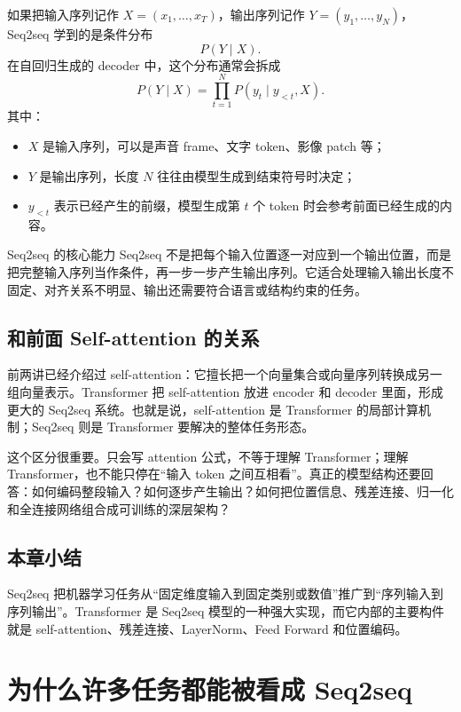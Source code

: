 \documentclass[a4paper]{article}
\begin{document}
如果把输入序列记作 $X=(x_1,\ldots,x_T)$，输出序列记作 $Y=(y_1,\ldots,y_N)$，Seq2seq 学到的是条件分布
\[
    P(Y\mid X).
\]
在自回归生成的 decoder 中，这个分布通常会拆成
\[
    P(Y\mid X)
    =
    \prod_{t=1}^{N} P(y_t \mid y_{<t}, X).
\]
其中：
\begin{itemize}
    \item $X$ 是输入序列，可以是声音 frame、文字 token、影像 patch 等；
    \item $Y$ 是输出序列，长度 $N$ 往往由模型生成到结束符号时决定；
    \item $y_{<t}$ 表示已经产生的前缀，模型生成第 $t$ 个 token 时会参考前面已经生成的内容。
\end{itemize}

\begin{importantbox}{Seq2seq 的核心能力}
    Seq2seq 不是把每个输入位置逐一对应到一个输出位置，而是把完整输入序列当作条件，再一步一步产生输出序列。它适合处理输入输出长度不固定、对齐关系不明显、输出还需要符合语言或结构约束的任务。
\end{importantbox}

\subsection{和前面 Self-attention 的关系}

前两讲已经介绍过 self-attention：它擅长把一个向量集合或向量序列转换成另一组向量表示。Transformer 把 self-attention 放进 encoder 和 decoder 里面，形成更大的 Seq2seq 系统。也就是说，self-attention 是 Transformer 的局部计算机制；Seq2seq 则是 Transformer 要解决的整体任务形态。

这个区分很重要。只会写 attention 公式，不等于理解 Transformer；理解 Transformer，也不能只停在“输入 token 之间互相看”。真正的模型结构还要回答：如何编码整段输入？如何逐步产生输出？如何把位置信息、残差连接、归一化和全连接网络组合成可训练的深层架构？

\subsection{本章小结}

Seq2seq 把机器学习任务从“固定维度输入到固定类别或数值”推广到“序列输入到序列输出”。Transformer 是 Seq2seq 模型的一种强大实现，而它内部的主要构件就是 self-attention、残差连接、LayerNorm、Feed Forward 和位置编码。

\section{为什么许多任务都能被看成 Seq2seq}
\end{document}
